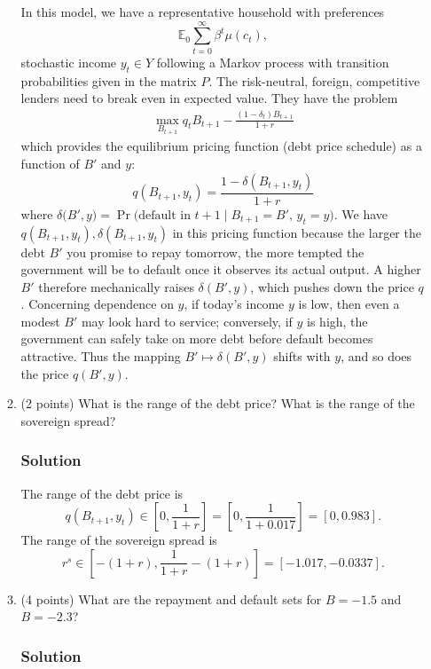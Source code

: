 \documentclass[12pt]{article}
\begin{document}
\begin{enumerate}
\begin{enumerate}[label=(\alph*)]
        In this model, we have a representative household with preferences 
        \[ \mathbb{E}_0 \sum_{t=0}^\infty \beta^t \mu(c_t),\]
        stochastic income $y_t\in Y$ following a Markov process with transition probabilities given in the matrix $P$. The risk-neutral, foreign, competitive lenders need to break even in expected value. They have the problem 
        \begin{align*}
            \max_{B_{t+1}} q_t B_{t+1} - \frac{(1-\delta_t)B_{t+1}}{1+r}
        \end{align*}
        which provides the equilibrium pricing function (debt price schedule) as a function of $B'$ and $y$:
        \[ q(B_{t+1}, y_t) = \frac{1-\delta(B_{t+1}, y_t)}{1+r}\] where $\delta\bigl(B',y\bigr)= \Pr\bigl(\text{default in }t+1\mid B_{t+1}=B',\,y_t=y\bigr).$
        We have $q(B_{t+1}, y_t), \delta(B_{t+1}, y_t)$ in this pricing function because the larger the debt \(B'\) you promise to repay tomorrow, the more tempted the government will be to default once it observes its actual output.  A higher \(B'\) therefore mechanically raises \(\delta(B',y)\), which pushes down the price \(q\). Concerning dependence on $y$, if today’s income \(y\) is low, then even a modest \(B'\) may look hard to service; conversely, if \(y\) is high, the government can safely take on more debt before default becomes attractive.  Thus the mapping \(B'\mapsto\delta(B',y)\) shifts with \(y\), and so does the price \(q(B',y)\).
        

        \item (2 points) What is the range of the debt price? What is the range of the sovereign spread?
        \subsubsection*{Solution}
        The range of the debt price is  \[ q(B_{t+1}, y_t) \in \left[ 0, \frac{1}{1+r}\right] = \left[0,\frac{1}{1+0.017}\right] =\left[0,0.983\right].\] %
        The range of the sovereign spread is 
        \[ r^s \in \left[ -(1+r), \frac{1}{1+r} -(1+r)\right] =\left[-1.017, -0.0337\right] .\] %
        

        \item (4 points) What are the repayment and default sets for $B = -1.5$ and $B = -2.3$?
        \subsubsection*{Solution}


\end{enumerate}
\end{enumerate}
\end{document}

